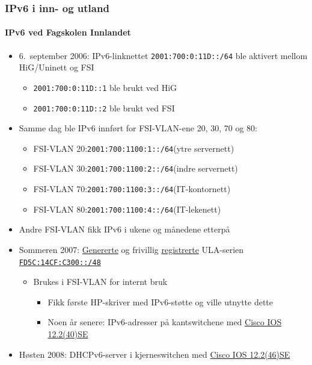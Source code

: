\begin{frame}%
  \frametitle{IPv6 i inn- og utland}
  \framesubtitle{IPv6 ved Fagskolen Innlandet}
  \begin{itemize}%
  \item 6.~september 2006: IPv6-linknettet
    \texttt{2001:700:0:11D::/64} ble aktivert mellom HiG/Uninett og
    FSI
    \begin{itemize}%
    \item \texttt{2001:700:0:11D::1} ble brukt ved HiG
    \item \texttt{2001:700:0:11D::2} ble brukt ved FSI
    \end{itemize}
  \item Samme dag ble IPv6 innført for FSI-VLAN-ene 20, 30, 70 og 80:
    \begin{itemize}%
    \item FSI-VLAN 20:\quad\texttt{2001:700:1100:1::/64}\hfill(ytre servernett)
    \item FSI-VLAN 30:\quad\texttt{2001:700:1100:2::/64}\hfill(indre servernett)
    \item FSI-VLAN 70:\quad\texttt{2001:700:1100:3::/64}\hfill(IT-kontornett)
    \item FSI-VLAN 80:\quad\texttt{2001:700:1100:4::/64}\hfill(IT-lekenett)
    \end{itemize}
  \item Andre FSI-VLAN fikk IPv6 i ukene og månedene etterpå
  \item Sommeren 2007:
    \href{http://www.sixxs.net/tools/grh/ula/}{Genererte} og frivillig
    \href{http://www.sixxs.net/tools/grh/ula/list/}{registrerte}
    ULA-serien
    \href{http://www.sixxs.net/tools/whois/?fd5c:14cf:c300::/48}{\texttt{FD5C:14CF:C300::/48}}
    \begin{itemize}%
    \item Brukes i FSI-VLAN for internt bruk
      \begin{itemize}%
      \item Fikk første HP-skriver med IPv6-støtte og ville utnytte dette
      \item Noen år senere: IPv6-adresser på kantswitchene med
        \href{http://www.cisco.com/en/US/docs/switches/lan/catalyst3750/software/release/12.2_40_se/release/notes/OL13860.html}{Cisco
          IOS 12.2(40)SE}
      \end{itemize}
    \end{itemize}
  \item Høsten 2008: DHCPv6-server i kjerneswitchen med
    \href{https://www.cisco.com/c/en/us/td/docs/switches/lan/catalyst3750/software/release/12-2_44_se/release/notes/OL14630.html}{Cisco
      IOS 12.2(46)SE}
  \end{itemize}
\end{frame}

